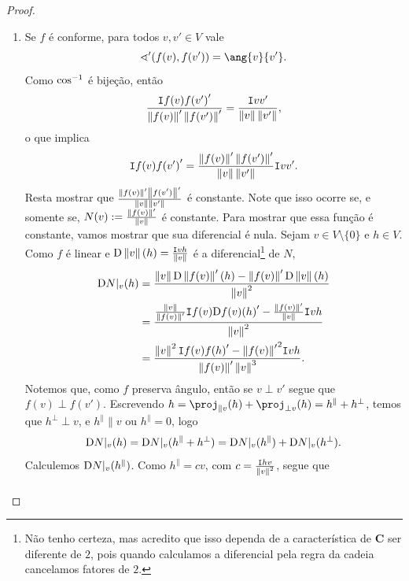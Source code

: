 \begin{proof}
\begin{enumerate}
	\item Se $f$ é conforme, para todos $v,v' \in V$ vale
		\begin{equation*}
		\sphericalangle'(f(v),f(v')) = \ang{v}{v'}.
		\end{equation*}
Como $\cos^{-1}$ é bijeção, então
	\begin{equation*}
	\frac{\mathtt I{f(v)}{f(v')}'}{\left\Vert{f(v)}\right\Vert'\left\Vert{f(v')}\right\Vert'} = \frac{\mathtt I{v}{v'}}{\left\Vert{v}\right\Vert\left\Vert{v'}\right\Vert},
	\end{equation*}
o que implica
	\begin{equation*}
	\mathtt I{f(v)}{f(v')}' = \frac{\left\Vert{f(v)}\right\Vert'\left\Vert{f(v')}\right\Vert'}{\left\Vert{v}\right\Vert\left\Vert{v'}\right\Vert}\mathtt I{v}{v'}.
	\end{equation*}
Resta mostrar que $\frac{\left\Vert{f(v)}\right\Vert'\left\Vert{f(v')}\right\Vert'}{\left\Vert{v}\right\Vert\left\Vert{v'}\right\Vert}$ é constante. Note que isso ocorre se, e somente se, $N(v) := \frac{\left\Vert{f(v)}\right\Vert'}{\left\Vert{v}\right\Vert}$ é constante. Para mostrar que essa função é constante, vamos mostrar que sua diferencial é nula. Sejam $v \in V \setminus \{0\}$ e $h \in V$. Como $f$ é linear e $\mathrm{D} \left\Vert{v}\right\Vert(h) = \frac{\mathtt I{v}{h}}{\left\Vert{v}\right\Vert}$ é a diferencial\footnote{Não tenho certeza, mas acredito que isso dependa de a característica de $\bm C$ ser diferente de $2$, pois quando calculamos a diferencial pela regra da cadeia cancelamos fatores de $2$.} de $N$,
	\begin{align*}
	\mathrm{D} N|_v (h) &= \frac{\left\Vert{v}\right\Vert \mathrm{D} \left\Vert{f(v)}\right\Vert'(h) - \left\Vert{f(v)}\right\Vert'\mathrm{D} \left\Vert{v}\right\Vert(h)}{\left\Vert{v}\right\Vert^2} \\
		&= \frac{\frac{\left\Vert{v}\right\Vert}{\left\Vert{f(v)}\right\Vert'} \mathtt I{f(v)}{\mathrm{D} f(v)(h)}' - \frac{\left\Vert{f(v)}\right\Vert'}{\left\Vert{v}\right\Vert}\mathtt I{v}{h}}{\left\Vert{v}\right\Vert^2} \\
		&= \frac{\left\Vert{v}\right\Vert^2\mathtt I{f(v)}{f(h)}' - {\left\Vert{f(v)}\right\Vert'}^2\mathtt I{v}{h}}{\left\Vert{f(v)}\right\Vert'\left\Vert{v}\right\Vert^3}.
	\end{align*}
Notemos que, como $f$ preserva ângulo, então se $v \perp v'$ segue que $f(v) \perp f(v')$. Escrevendo $h = \proj_{\parallel v}(h) + \proj_{\perp v}(h) = h^\parallel + h^\perp$, temos que $h^\perp \perp v$, e $h^\parallel \parallel v$ ou $h^\parallel = 0$, logo
	\begin{equation*}
	\mathrm{D} N|_v (h) = \mathrm{D} N|_v (h^\parallel + h^\perp) =  \mathrm{D} N|_v (h^\parallel) + \mathrm{D} N|_v (h^\perp).
	\end{equation*}
Calculemos $\mathrm{D} N|_v (h^\parallel)$.
Como $h^\parallel = cv$, com $c=\frac{\mathtt I{h}{v}}{\left\Vert{v}\right\Vert^2}$, segue que
	\begin{align*}

\end{align*}
\end{enumerate}
\end{proof}
